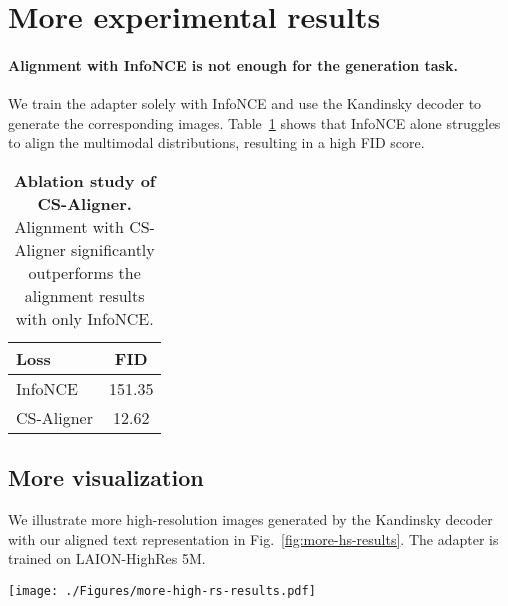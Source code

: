 


\section{More experimental results}


\paragraph{Alignment with InfoNCE is not enough for the generation task.} 
We train the adapter solely with InfoNCE and use the Kandinsky decoder to generate the corresponding images. Table~\ref{tab:loss_comparison} shows that InfoNCE alone struggles to align the multimodal distributions, resulting in a high FID score. 

\begin{table}[htbp]
\centering
\caption{\textbf{Ablation study of CS-Aligner.} Alignment with CS-Aligner significantly outperforms the alignment results with only InfoNCE.}
\label{tab:loss_comparison}
\small %
\begin{tabular}{lc}
\toprule
\textbf{Loss} & \textbf{FID} \\ 
\midrule
InfoNCE & 151.35 \\ 
CS-Aligner & 12.62 \\ 
\bottomrule
\end{tabular}
\end{table}




\subsection{More visualization} We illustrate more high-resolution images generated by the Kandinsky decoder with our aligned text representation in Fig.~\ref{fig:more-hs-results}. The adapter is trained on LAION-HighRes 5M.

\begin{figure*}[htbp]
  \centering  \texttt{[image: ./Figures/more-high-rs-results.pdf]} %
\caption{\textbf{Qualitative visualization.} The adapter is trained on LAION-HighRes 5M. The aligned text representation is then decoded by the Kandinsky decoder. } 
\label{fig:more-hs-results}
\end{figure*}




